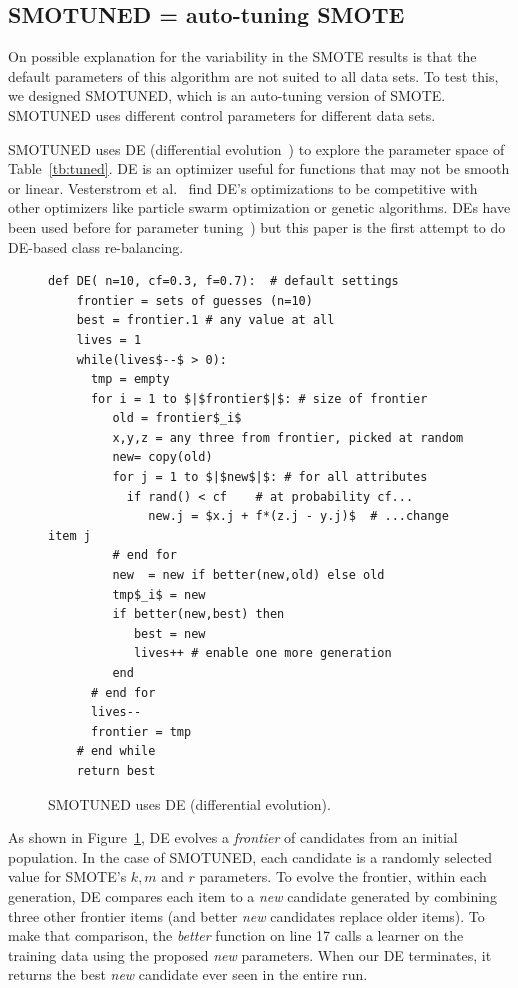 \documentclass[10pt,conference]{IEEEtran}
\theoremstyle{break}
\theoremstyle{break}
\begin{document}
\subsection{SMOTUNED = auto-tuning SMOTE}
\label{sect:smotuned}

On possible explanation for the variability in the SMOTE results is that the
default parameters of this algorithm are not suited to all data sets. To test this,
we designed SMOTUNED, which is an auto-tuning version of SMOTE.   SMOTUNED
uses different control parameters for different data sets.


 
SMOTUNED uses DE (differential evolution~\cite{storn1997differential}) to explore the parameter space of
Table~\ref{tb:tuned}.  DE is an
optimizer useful for functions that may not be smooth or linear.  Vesterstrom et al.~\cite{Vesterstrom04} find   DE's optimizations to be  competitive with other optimizers like 
   particle swarm optimization or genetic algorithms.
   DEs have been used before for   parameter tuning~\cite{omran2005differential, chiha2012tuning,fu2016tuning,fu2017easy, agrawal2016wrong}) but this paper is  the first attempt to do
   DE-based class re-balancing.

\begin{figure}[!b]
\scriptsize
\begin{lstlisting}[mathescape,linewidth=8.2cm,frame=r,numbers=right]
  def DE( n=10, cf=0.3, f=0.7):  # default settings
    frontier = sets of guesses (n=10)
    best = frontier.1 # any value at all
    lives = 1
    while(lives$--$ > 0): 
      tmp = empty
      for i = 1 to $|$frontier$|$: # size of frontier
         old = frontier$_i$
         x,y,z = any three from frontier, picked at random
         new= copy(old)  
         for j = 1 to $|$new$|$: # for all attributes
           if rand() < cf    # at probability cf...
              new.j = $x.j + f*(z.j - y.j)$  # ...change item j
         # end for
         new  = new if better(new,old) else old
         tmp$_i$ = new 
         if better(new,best) then
            best = new
            lives++ # enable one more generation
         end                  
      # end for
      lives--
      frontier = tmp
    # end while
    return best
\end{lstlisting}
\caption{SMOTUNED uses DE (differential evolution).}
\label{fig:pseudo_DE}  
\end{figure}


As shown in Figure~\ref{fig:pseudo_DE}, DE evolves a \textit{frontier} of
candidates from an initial population. In the case of SMOTUNED,
each  candidate is a randomly selected value for SMOTE's $k, m$ and $r$ parameters.
 To evolve the frontier, within each generation,
 DE compares each item to a {\em new} candidate generated
 by combining three other frontier items (and better {\em new} candidates replace
 older items). 
 To make that comparison, the {\em better} function on line 17 calls a learner on the training data using the proposed {\em new} parameters.
 When our DE  terminates, it returns the best {\em new} candidate ever seen in the entire run.
 
\end{document}
